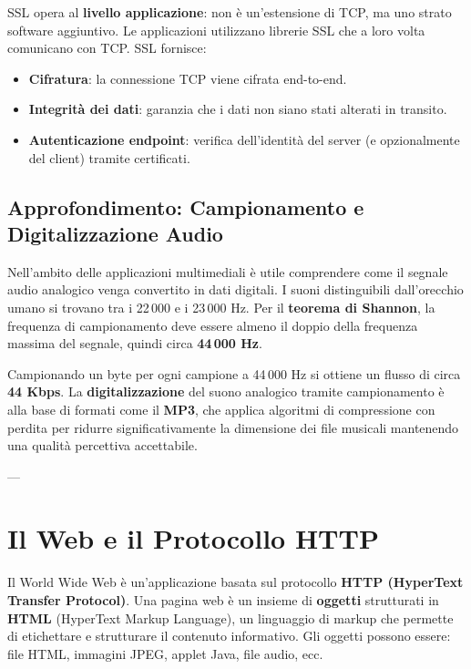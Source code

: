 SSL opera al \textbf{livello applicazione}: non è un'estensione di TCP, ma uno strato software aggiuntivo. Le applicazioni utilizzano librerie SSL che a loro volta comunicano con TCP. SSL fornisce:
\begin{itemize}
    \item \textbf{Cifratura}: la connessione TCP viene cifrata end-to-end.
    \item \textbf{Integrità dei dati}: garanzia che i dati non siano stati alterati in transito.
    \item \textbf{Autenticazione endpoint}: verifica dell'identità del server (e opzionalmente del client) tramite certificati.
\end{itemize}


\subsection{Approfondimento: Campionamento e Digitalizzazione Audio}
Nell'ambito delle applicazioni multimediali è utile comprendere come il segnale audio analogico venga convertito in dati digitali. I suoni distinguibili dall'orecchio umano si trovano tra i 22\,000 e i 23\,000 Hz. Per il \textbf{teorema di Shannon}, la frequenza di campionamento deve essere almeno il doppio della frequenza massima del segnale, quindi circa \textbf{44\,000 Hz}.

Campionando un byte per ogni campione a 44\,000 Hz si ottiene un flusso di circa \textbf{44 Kbps}. La \textbf{digitalizzazione} del suono analogico tramite campionamento è alla base di formati come il \textbf{MP3}, che applica algoritmi di compressione con perdita per ridurre significativamente la dimensione dei file musicali mantenendo una qualità percettiva accettabile.

---
\section{Il Web e il Protocollo HTTP}
Il World Wide Web è un'applicazione basata sul protocollo \textbf{HTTP (HyperText Transfer Protocol)}. Una pagina web è un insieme di \textbf{oggetti} strutturati in \textbf{HTML} (HyperText Markup Language), un linguaggio di markup che permette di etichettare e strutturare il contenuto informativo. Gli oggetti possono essere: file HTML, immagini JPEG, applet Java, file audio, ecc.

